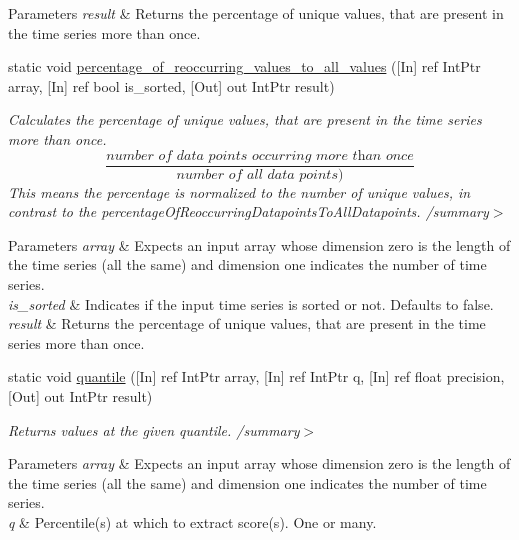 \begin{DoxyCompactItemize}
\begin{DoxyCompactList}
\begin{DoxyParams}{Parameters}
\hline
{\em result} & Returns the percentage of unique values, that are present in the time series more than once.\\
\hline
\end{DoxyParams}
\end{DoxyCompactList}\item 
static void \mbox{\hyperlink{classkhiva_1_1interop_1_1_d_l_l_features_a18f68c40c2e747582e31c1541cd188f5}{percentage\+\_\+of\+\_\+reoccurring\+\_\+values\+\_\+to\+\_\+all\+\_\+values}} (\mbox{[}In\mbox{]} ref Int\+Ptr array, \mbox{[}In\mbox{]} ref bool is\+\_\+sorted, \mbox{[}Out\mbox{]} out Int\+Ptr result)
\begin{DoxyCompactList}\small\item\em Calculates the percentage of unique values, that are present in the time series more than once. \[ \frac{\textit{number of data points occurring more than once}}{\textit{number of all data points})} \] This means the percentage is normalized to the number of unique values, in contrast to the percentage\+Of\+Reoccurring\+Datapoints\+To\+All\+Datapoints. /summary$>$ 
\begin{DoxyParams}{Parameters}
{\em array} & Expects an input array whose dimension zero is the length of the time series (all the same) and dimension one indicates the number of time series.\\
\hline
{\em is\+\_\+sorted} & Indicates if the input time series is sorted or not. Defaults to false.\\
\hline
{\em result} & Returns the percentage of unique values, that are present in the time series more than once.\\
\hline
\end{DoxyParams}
\end{DoxyCompactList}\item 
static void \mbox{\hyperlink{classkhiva_1_1interop_1_1_d_l_l_features_a72b887d0da16c17aad67c54e1c2e0184}{quantile}} (\mbox{[}In\mbox{]} ref Int\+Ptr array, \mbox{[}In\mbox{]} ref Int\+Ptr q, \mbox{[}In\mbox{]} ref float precision, \mbox{[}Out\mbox{]} out Int\+Ptr result)
\begin{DoxyCompactList}\small\item\em Returns values at the given quantile. /summary$>$ 
\begin{DoxyParams}{Parameters}
{\em array} & Expects an input array whose dimension zero is the length of the time series (all the same) and dimension one indicates the number of time series.\\
\hline
{\em q} & Percentile(s) at which to extract score(s). One or many.\\

\end{DoxyParams}
\end{DoxyCompactList}
\end{DoxyCompactItemize}
